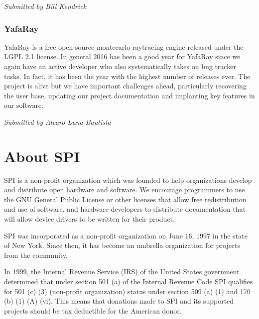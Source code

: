 \documentclass[letterpaper]{report}
\begin{document}
{\em Submitted by Bill Kendrick}

\subsection{YafaRay}

YafaRay is a free open-source montecarlo raytracing engine released
under the LGPL 2.1 license.  In general 2016 has been a good year for
YafaRay since we again have an active developer who also systematically
takes on bug tracker tasks.  In fact, it has been the year with the
highest number of releases ever. The project is alive but we have
important challenges ahead, particularly recovering the user base,
updating our project documentation and implanting key features in our
software.

{\em Submitted by Alvaro Luna Bautista}


\appendix
\chapter{About SPI}

SPI is a non-profit organization which was founded to help organizations
develop and distribute open hardware and software. We encourage programmers
to use the GNU General Public License or other licenses that allow free
redistribution and use of software, and hardware developers to distribute
documentation that will allow device drivers to be written for their product.

SPI was incorporated as a non-profit organization on June 16, 1997 in the state
of New York. Since then, it has become an umbrella organization for projects
from the community.

In 1999, the Internal Revenue Service (IRS) of the United States government
determined that under section 501 (a) of the Internal Revenue Code SPI
qualifies for 501 (c) (3) (non-profit organization) status under section 509
(a) (1) and 170 (b) (1) (A) (vi). This means that donations made to SPI and its
supported projects should be tax deductible for the American donor.
\end{document}
